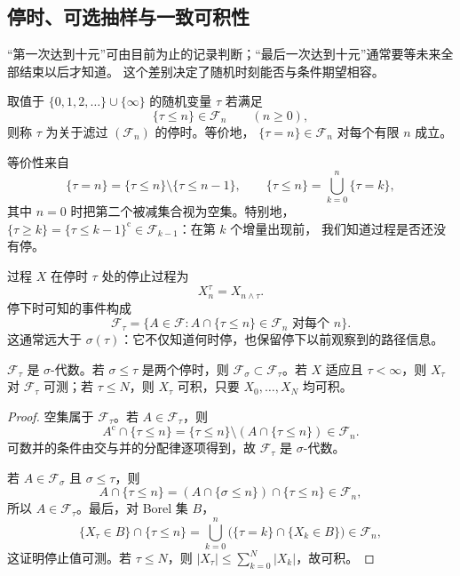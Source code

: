 \subsection{停时、可选抽样与一致可积性}\label{subsec:6-2-3}

“第一次达到十元”可由目前为止的记录判断；“最后一次达到十元”通常要等未来全部结束以后才知道。
这个差别决定了随机时刻能否与条件期望相容。

\begin{definition}[停时]\label{def:6-2-3-1}
取值于 $\{0,1,2,\ldots\}\cup\{\infty\}$ 的随机变量 $\tau$ 若满足
\[
  \{\tau\le n\}\in\mathcal F_n\qquad(n\ge0),
\]
则称 $\tau$ 为关于滤过 $(\mathcal F_n)$ 的停时。等价地，
$\{\tau=n\}\in\mathcal F_n$ 对每个有限 $n$ 成立。
\end{definition}

等价性来自
\[
 \{\tau=n\}=\{\tau\le n\}\setminus\{\tau\le n-1\},
 \qquad
 \{\tau\le n\}=\bigcup_{k=0}^n\{\tau=k\},
\]
其中 $n=0$ 时把第二个被减集合视为空集。特别地，
$\{\tau\ge k\}=\{\tau\le k-1\}^{\mathrm c}\in\mathcal F_{k-1}$：在第 $k$ 个增量出现前，
我们知道过程是否还没有停。

\begin{definition}[停止过程与停止信息]\label{def:6-2-3-2}
过程 $X$ 在停时 $\tau$ 处的停止过程为
\[
  X_n^\tau=X_{n\wedge\tau}.
\]
停下时可知的事件构成
\[
 \mathcal F_\tau
 =\{A\in\mathcal F:A\cap\{\tau\le n\}\in\mathcal F_n
                  \text{ 对每个 }n\}.
\]
这通常远大于 $\sigma(\tau)$：它不仅知道何时停，也保留停下以前观察到的路径信息。
\end{definition}

\begin{lemma}[停止信息的基本性质]\label{lemma:6-2-3-stopped-sigma}
$\mathcal F_\tau$ 是 $\sigma$-代数。若 $\sigma\le\tau$ 是两个停时，则
$\mathcal F_\sigma\subset\mathcal F_\tau$。若 $X$ 适应且 $\tau<\infty$，则
$X_\tau$ 对 $\mathcal F_\tau$ 可测；若 $\tau\le N$，则 $X_\tau$ 可积，只要
$X_0,\ldots,X_N$ 均可积。
\end{lemma}

\begin{proof}
空集属于 $\mathcal F_\tau$。若 $A\in\mathcal F_\tau$，则
\[
 A^{\mathrm c}\cap\{\tau\le n\}
 =\{\tau\le n\}\setminus(A\cap\{\tau\le n\})\in\mathcal F_n.
\]
可数并的条件由交与并的分配律逐项得到，故 $\mathcal F_\tau$ 是 $\sigma$-代数。

若 $A\in\mathcal F_\sigma$ 且 $\sigma\le\tau$，则
\[
 A\cap\{\tau\le n\}
 =(A\cap\{\sigma\le n\})\cap\{\tau\le n\}\in\mathcal F_n,
\]
所以 $A\in\mathcal F_\tau$。最后，对 Borel 集 $B$，
\[
 \{X_\tau\in B\}\cap\{\tau\le n\}
 =\bigcup_{k=0}^n\bigl(\{\tau=k\}\cap\{X_k\in B\}\bigr)\in\mathcal F_n,
\]
这证明停止值可测。若 $\tau\le N$，则
$|X_\tau|\le\sum_{k=0}^N|X_k|$，故可积。
\end{proof}


